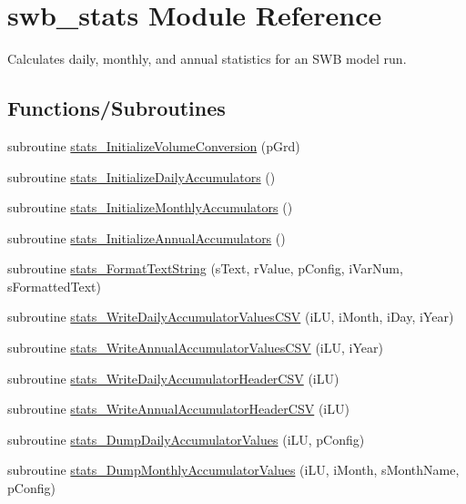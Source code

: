 \hypertarget{namespaceswb__stats}{
\section{swb\_\-stats Module Reference}
\label{namespaceswb__stats}
}


Calculates daily, monthly, and annual statistics for an SWB model run.  


\subsection*{Functions/Subroutines}
\begin{DoxyCompactItemize}
\item 
subroutine \hyperlink{namespaceswb__stats_a310f0f7b08aa679de6907fc3870bac76}{stats\_\-InitializeVolumeConversion} (pGrd)
\item 
subroutine \hyperlink{namespaceswb__stats_a5ba844557dec513710f283c41a9a265c}{stats\_\-InitializeDailyAccumulators} ()
\item 
subroutine \hyperlink{namespaceswb__stats_a3d947e5ebbe4b649820b9de1e118efb0}{stats\_\-InitializeMonthlyAccumulators} ()
\item 
subroutine \hyperlink{namespaceswb__stats_a5fbf4ac0d23ffb2a7aa6dbe4be8c8164}{stats\_\-InitializeAnnualAccumulators} ()
\item 
subroutine \hyperlink{namespaceswb__stats_a07fff21d7f416822a1e78b4de9580fc7}{stats\_\-FormatTextString} (sText, rValue, pConfig, iVarNum, sFormattedText)
\item 
subroutine \hyperlink{namespaceswb__stats_a7680fbd498a0bf44089b1e12baf9221a}{stats\_\-WriteDailyAccumulatorValuesCSV} (iLU, iMonth, iDay, iYear)
\item 
subroutine \hyperlink{namespaceswb__stats_affd85de02d34bd4608aec046a8a28a57}{stats\_\-WriteAnnualAccumulatorValuesCSV} (iLU, iYear)
\item 
subroutine \hyperlink{namespaceswb__stats_ae8dd9a43d8d8b6499f5b0556f4d7f374}{stats\_\-WriteDailyAccumulatorHeaderCSV} (iLU)
\item 
subroutine \hyperlink{namespaceswb__stats_a702b2071b18f3bf1b5569bcf5b6bef3e}{stats\_\-WriteAnnualAccumulatorHeaderCSV} (iLU)
\item 
subroutine \hyperlink{namespaceswb__stats_a0d9031a1acff05d4d1e6d46d8c4e3263}{stats\_\-DumpDailyAccumulatorValues} (iLU, pConfig)
\item 
subroutine \hyperlink{namespaceswb__stats_a2d6e66544a4b71402f6bb7075d590df8}{stats\_\-DumpMonthlyAccumulatorValues} (iLU, iMonth, sMonthName, pConfig)

\end{DoxyCompactItemize}
